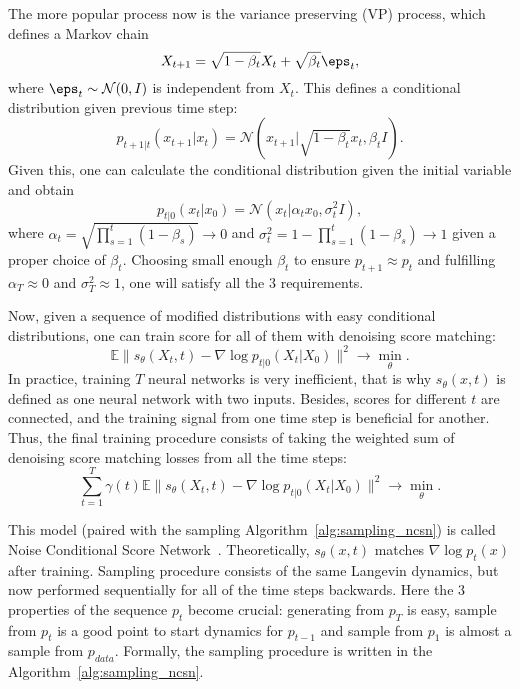 The more popular process now is the variance preserving (VP) process, which defines a Markov chain
\begin{equation}\label{eq:vp_process}
    X_{t + 1} = \sqrt{1 - \beta_t} X_t + \sqrt{\beta_t} \eps_t,    
\end{equation}
where $\eps_t \sim \mathcal{N}(0, I)$ is independent from $X_t$. This defines a conditional distribution given previous time step:
\[
    p_{t + 1 | t}(x_{t + 1} | x_t) = \mathcal{N}(x_{t + 1} | \sqrt{1 - \beta_t} x_t, \beta_t I).
\]
Given this, one can calculate the conditional distribution given the initial variable and obtain~\cite{ho2020denoising}
\[
    p_{t | 0}(x_t | x_0) = \mathcal{N}(x_t | \alpha_t x_0, \sigma^2_t I),
\]
where $\alpha_t = \sqrt{\prod_{s = 1}^{t} (1 - \beta_s)} \rightarrow 0$ and $\sigma^2_t = 1 - \prod_{s = 1}^{t}(1 - \beta_s) \rightarrow 1$ given a proper choice of $\beta_t$. Choosing small enough $\beta_t$ to ensure $p_{t + 1} \approx p_{t}$ and fulfilling $\alpha_T \approx 0$ and $\sigma_T^2 \approx 1$, one will satisfy all the 3 requirements.

Now, given a sequence of modified distributions with easy conditional distributions, one can train score for all of them with denoising score matching:
\[
    \mathbb{E}\|s_\theta(X_t, t) - \nabla \log p_{t | 0}(X_t | X_0) \|^2 \rightarrow \min\limits_{\theta}.
\]
In practice, training $T$ neural networks is very inefficient, that is why $s_\theta(x, t)$ is defined as one neural network with two inputs. Besides, scores for different $t$ are connected, and the training signal from one time step is beneficial for another. Thus, the final training procedure consists of taking the weighted sum of denoising score matching losses from all the time steps:
\begin{equation}\label{eq:ncsn_training}
    \sum\limits_{t = 1}^{T} \gamma(t) \mathbb{E}\|s_\theta(X_t, t) - \nabla \log p_{t | 0}(X_t | X_0) \|^2 \rightarrow \min\limits_{\theta}.
\end{equation}

This model (paired with the sampling Algorithm~\ref{alg:sampling_ncsn}) is called Noise Conditional Score Network~\cite{song2019generative}. Theoretically, $s_{\theta}(x, t)$ matches $\nabla \log p_{t}(x)$ after training. Sampling procedure consists of the same Langevin dynamics, but now performed sequentially for all of the time steps backwards. Here the 3 properties of the sequence $p_t$ become crucial: generating from $p_T$ is easy, sample from $p_{t}$ is a good point to start dynamics for $p_{t - 1}$ and sample from $p_{1}$ is almost a sample from $p_{data}$. Formally, the sampling procedure is written in the Algorithm~\ref{alg:sampling_ncsn}.

